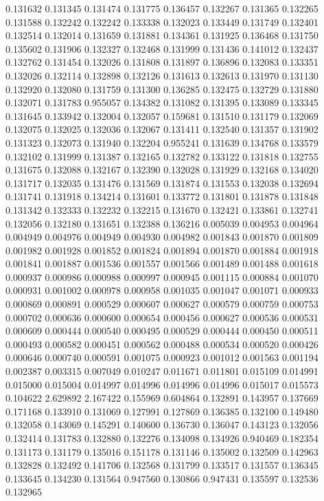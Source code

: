 0.131632
0.131345
0.131474
0.131775
0.136457
0.132267
0.131365
0.132265
0.131588
0.132242
0.132242
0.133338
0.132023
0.133449
0.131749
0.132401
0.132514
0.132014
0.131659
0.131881
0.134361
0.131925
0.136468
0.131750
0.135602
0.131906
0.132327
0.132468
0.131999
0.131436
0.141012
0.132437
0.132762
0.131454
0.132026
0.131808
0.131897
0.136896
0.132083
0.133351
0.132026
0.132114
0.132898
0.132126
0.131613
0.132613
0.131970
0.131130
0.132920
0.132080
0.131759
0.131300
0.136285
0.132475
0.132729
0.131880
0.132071
0.131783
0.955057
0.134382
0.131082
0.131395
0.133089
0.133345
0.131645
0.133942
0.132004
0.132057
0.159681
0.131510
0.131179
0.132069
0.132075
0.132025
0.132036
0.132067
0.131411
0.132540
0.131357
0.131902
0.131323
0.132073
0.131940
0.132204
0.955241
0.131639
0.134768
0.133579
0.132102
0.131999
0.131387
0.132165
0.132782
0.133122
0.131818
0.132755
0.131675
0.132088
0.132167
0.132390
0.132028
0.131929
0.132168
0.134020
0.131717
0.132035
0.131476
0.131569
0.131874
0.131553
0.132038
0.132694
0.131741
0.131918
0.134214
0.131601
0.133772
0.131801
0.131878
0.131848
0.131342
0.132333
0.132232
0.132215
0.131670
0.132421
0.133861
0.132741
0.132056
0.132180
0.131651
0.132388
0.136216
0.005039
0.004953
0.004964
0.004949
0.004976
0.004949
0.004930
0.004982
0.001843
0.001870
0.001809
0.001982
0.001928
0.001852
0.001824
0.001894
0.001870
0.001884
0.001918
0.001841
0.001887
0.001536
0.001557
0.001566
0.001489
0.001488
0.001618
0.000937
0.000986
0.000988
0.000997
0.000945
0.001115
0.000884
0.001070
0.000931
0.001002
0.000978
0.000958
0.001035
0.001047
0.001071
0.000933
0.000869
0.000891
0.000529
0.000607
0.000627
0.000579
0.000759
0.000753
0.000702
0.000636
0.000600
0.000654
0.000456
0.000627
0.000536
0.000531
0.000609
0.000444
0.000540
0.000495
0.000529
0.000444
0.000450
0.000511
0.000493
0.000582
0.000451
0.000562
0.000488
0.000534
0.000520
0.000426
0.000646
0.000740
0.000591
0.001075
0.000923
0.001012
0.001563
0.001194
0.002387
0.003315
0.007049
0.010247
0.011671
0.011801
0.015109
0.014991
0.015000
0.015004
0.014997
0.014996
0.014996
0.014996
0.015017
0.015573
0.104622
2.629892
2.167422
0.155969
0.604864
0.132891
0.143957
0.137669
0.171168
0.133910
0.131069
0.127991
0.127869
0.136385
0.132100
0.149480
0.132058
0.143069
0.145291
0.140600
0.136730
0.136047
0.143123
0.132056
0.132414
0.131783
0.132880
0.132276
0.134098
0.134926
0.940469
0.182354
0.131173
0.131179
0.135016
0.151178
0.131146
0.135002
0.132509
0.142963
0.132828
0.132492
0.141706
0.132568
0.131799
0.133517
0.131557
0.136345
0.133645
0.134230
0.131564
0.947560
0.130866
0.947431
0.135597
0.132536
0.132965
